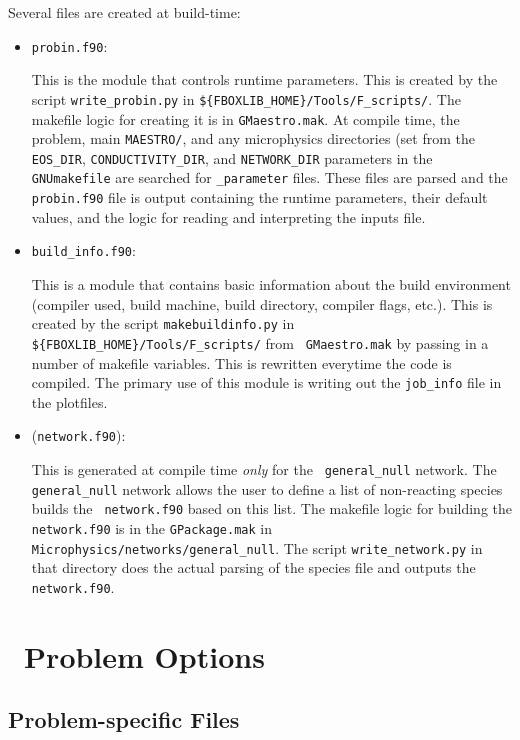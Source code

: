Several files are created at build-time:
\begin{itemize}
\item {\tt probin.f90}:

  This is the module that controls runtime parameters.  This is
  created by the script
  {\tt write\_probin.py} in {\tt \$\{FBOXLIB\_HOME\}/Tools/F\_scripts/}.  The
  makefile logic for creating it is in {\tt GMaestro.mak}.  At compile
  time, the problem, main {\tt MAESTRO/}, and any microphysics
  directories (set from the {\tt EOS\_DIR}, {\tt CONDUCTIVITY\_DIR}, and {\tt NETWORK\_DIR} parameters in the {\tt GNUmakefile}
  are searched for {\tt \_parameter} files.  These files
  are parsed and the {\tt probin.f90} file is output containing the 
  runtime parameters, their default values, and the logic for reading
  and interpreting the inputs file.

\item {\tt build\_info.f90}:

  This is a module that contains basic information about the build
  environment (compiler used, build machine, build directory, compiler
  flags, etc.).  This is created by the script {\tt makebuildinfo.py}
  in {\tt \$\{FBOXLIB\_HOME\}/Tools/F\_scripts/} from {\tt
  GMaestro.mak} by passing in a number of makefile variables.  This is
  rewritten everytime the code is compiled.  The primary use of this
  module is writing out the {\tt job\_info} file in the plotfiles.

\item ({\tt network.f90}):

  This is generated at compile time {\em only} for the {\tt
  general\_null} network.  The {\tt general\_null} network allows the
  user to define a list of non-reacting species builds the {\tt
  network.f90} based on this list.  The makefile logic for building
  the {\tt network.f90} is in the {\tt GPackage.mak} in {\tt
  Microphysics/networks/general\_null}.  The script {\tt write\_network.py}
  in that directory does the actual parsing of the species file and
  outputs the {\tt network.f90}.


\end{itemize}



\section{\maestro\ Problem Options}

\subsection{Problem-specific Files}
\label{sec:make:otherfiles}

